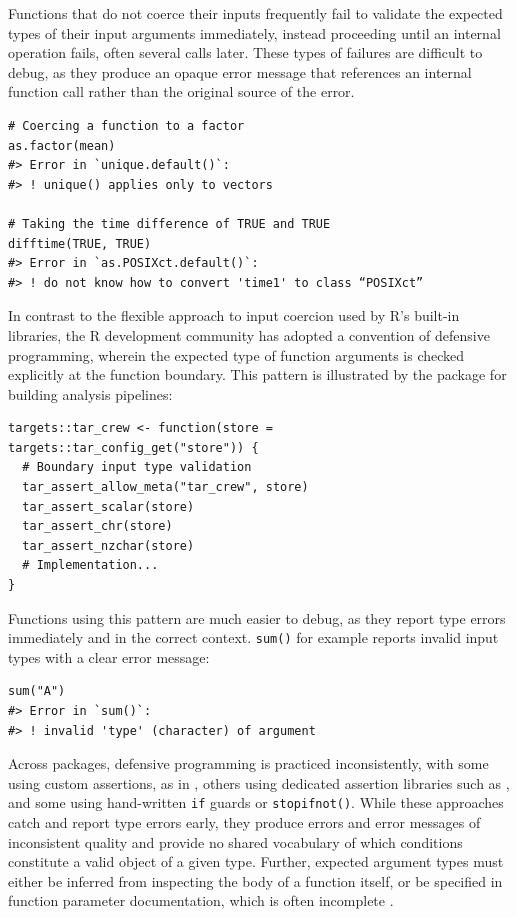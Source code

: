 Functions that do not coerce their inputs frequently fail to validate the expected types of their input arguments immediately, instead proceeding until an internal operation fails, often several calls later. These types of failures are difficult to debug, as they produce an opaque error message that references an internal function call rather than the original source of the error.

\begin{verbatim}
# Coercing a function to a factor
as.factor(mean)
#> Error in `unique.default()`:
#> ! unique() applies only to vectors

# Taking the time difference of TRUE and TRUE
difftime(TRUE, TRUE)
#> Error in `as.POSIXct.default()`:
#> ! do not know how to convert 'time1' to class “POSIXct”
\end{verbatim}

In contrast to the flexible approach to input coercion used by R's built-in libraries, the R development community has adopted a convention of defensive programming, wherein the expected type of function arguments is checked explicitly at the function boundary. This pattern is illustrated by the  package \citep{targets} for building analysis pipelines:

\begin{verbatim}
targets::tar_crew <- function(store = targets::tar_config_get("store")) {
  # Boundary input type validation
  tar_assert_allow_meta("tar_crew", store)
  tar_assert_scalar(store)
  tar_assert_chr(store)
  tar_assert_nzchar(store)
  # Implementation...
}
\end{verbatim}

Functions using this pattern are much easier to debug, as they report type errors immediately and in the correct context. \texttt{sum()} for example reports invalid input types with a clear error message:

\begin{verbatim}
sum("A")
#> Error in `sum()`:
#> ! invalid 'type' (character) of argument
\end{verbatim}

Across packages, defensive programming is practiced inconsistently, with some using custom assertions, as in , others using dedicated assertion libraries such as  \citep{checkmate}, and some using hand-written \texttt{if} guards or \texttt{stopifnot()}. While these approaches catch and report type errors early, they produce errors and error messages of inconsistent quality and provide no shared vocabulary of which conditions constitute a valid object of a given type. Further, expected argument types must either be inferred from inspecting the body of a function itself, or be specified in function parameter documentation, which is often incomplete \citep{vidoni2022}.

